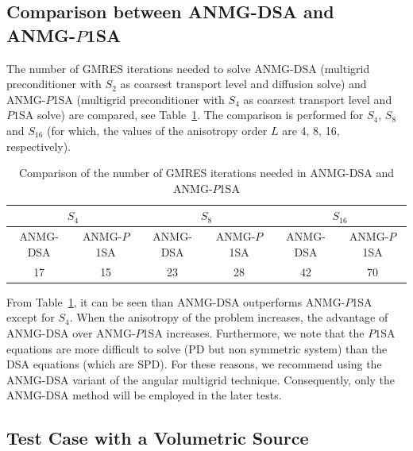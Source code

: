 \documentclass[preprint,10pt]{elsarticle}
\renewcommand{\(}{\left(}
\renewcommand{\)}{\right)}
\renewcommand{\[}{\left[}
\renewcommand{\]}{\right]}
\newcommand{\tbl}[1]{Table~\ref{#1}}                     %
\begin{document}
\subsection{Comparison between ANMG-DSA and ANMG-$P$1SA}

The number of GMRES iterations needed to solve ANMG-DSA (multigrid preconditioner with $S_2$ as 
coarsest transport level and diffusion solve) and ANMG-$P$1SA (multigrid preconditioner with $S_4$ as 
coarsest transport level and $P1$SA solve) are compared, see \tbl{tab:1}. The
comparison is performed for $S_4$, $S_8$ and $S_{16}$ (for which, the values
of the anisotropy order $L$ are 4, 8, 16, respectively). 
%
\begin{table}[H]
\begin{center}
\begin{tabular}{|c|c||c|c||c|c|}
\hline
\multicolumn{2}{|c||}{$S_4$} & \multicolumn{2}{c||}{$S_8$} &
\multicolumn{2}{c|}{$S_{16}$}\\
\hline
ANMG-DSA & ANMG-$P$1SA & ANMG-DSA & ANMG-$P$1SA & ANMG-DSA & ANMG-$P$1SA\\
\hline
17 &  15 & 23 & 28 & 42 & 70\\
\hline
\end{tabular}
\caption{Comparison of the number of GMRES iterations needed in  ANMG-DSA and
ANMG-$P$1SA}
\label{tab:1}
\end{center}
\end{table}
%
From \tbl{tab:1}, it can be seen than ANMG-DSA outperforms ANMG-$P$1SA except for
$S_4$. When the anisotropy of the problem increases, the advantage of ANMG-DSA
over ANMG-$P$1SA increases. Furthermore,  we note that 
the $P1$SA equations are more difficult to solve (PD but non symmetric system) than the DSA equations
(which are SPD). 
For these reasons, we recommend using the ANMG-DSA variant of the angular multigrid technique. Consequently, only the ANMG-DSA method will be employed in the later tests.

\subsection{Test Case with a Volumetric Source}
\end{document}

